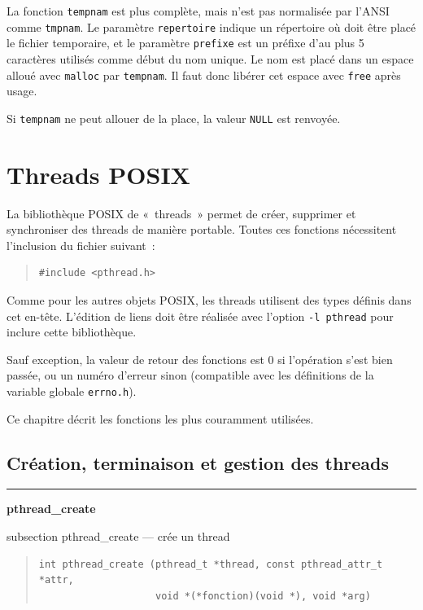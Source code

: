 \documentclass [twoside] {report}
\newcommand {\primitive} [1]
    {
	\phantomsection
	{\large \textbf {#1}}
	\addcontentsline {toc} {subsection} {#1}
    }
\newcommand {\separation}
    {
	\vspace {5mm}
	\nopagebreak
	\hrule
    }
\begin{document}
La fonction \texttt {tempnam} est plus complète, mais n'est pas normalisée
par l'ANSI comme \texttt {tmpnam}. Le paramètre \texttt {repertoire} indique un
répertoire où doit être placé le fichier temporaire, et le paramètre
\texttt {prefixe} est un préfixe d'au plus 5 caractères utilisés comme début
du nom unique. Le nom est placé dans un espace alloué avec \texttt {malloc}
par \texttt {tempnam}. Il faut donc libérer cet espace avec \texttt {free} après
usage.

Si \texttt {tempnam} ne peut allouer de la place, la valeur \texttt {NULL} est
renvoyée.



\cleardoublepage
\chapter {Threads POSIX}

La bibliothèque POSIX de «~threads~» permet de créer, supprimer et
synchroniser des threads de manière portable. Toutes ces fonctions
nécessitent l'inclusion du fichier suivant~:

\begin {quote}
\begin {verbatim}
#include <pthread.h>
\end{verbatim}
\end {quote}

Comme pour les autres objets POSIX, les threads utilisent des types
définis dans cet en-tête. L'édition de liens doit être réalisée avec
l'option \verb|-l pthread| pour inclure cette bibliothèque.

Sauf exception, la valeur de retour des fonctions est 0 si l'opération
s'est bien passée, ou un numéro d'erreur sinon (compatible avec les
définitions de la variable globale \texttt {errno.h}).

Ce chapitre décrit les fonctions les plus couramment utilisées.


\section {Création, terminaison et gestion des threads}

\separation 
\primitive {pthread\_create} --- crée un thread

\begin {quote}
\begin {verbatim}
int pthread_create (pthread_t *thread, const pthread_attr_t *attr,
                    void *(*fonction)(void *), void *arg)
\end{verbatim}
\end {quote}
\end{document}
